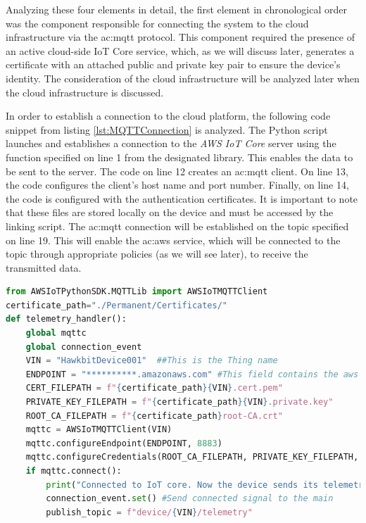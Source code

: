 Analyzing these four elements in detail, the first element in chronological order was the component responsible for connecting the system to the cloud infrastructure via the \gls{ac:mqtt} protocol. This component required the presence of an active cloud-side IoT Core service, which, as we will discuss later, generates a certificate with an attached public and private key pair to ensure the device's identity. The consideration of the cloud infrastructure will be analyzed later when the cloud infrastructure is discussed.

In order to establish a connection to the cloud platform, the following code snippet from listing \ref{lst:MQTTConnection} is analyzed. The Python script launches and establishes a connection to the \textit{AWS IoT Core} server using the function specified on line 1 from the designated library. This enables the data to be sent to the server. The code on line 12 creates an \gls{ac:mqtt} client. On line 13, the code configures the client's host name and port number. Finally, on line 14, the code is configured with the authentication certificates. It is important to note that these files are stored locally on the device and must be accessed by the linking script. The \gls{ac:mqtt} connection will be established on the topic specified on line 19. This will enable the \gls{ac:aws} service, which will be connected to the topic through appropriate policies (as we will see later), to receive the transmitted data.

\begin{lstlisting}[language=Python, caption={\textit{MQTT} connection to the \textit{AWS IoT Core} \textit{AWS} service}, label=lst:MQTTConnection, linerange={1-23}]
from AWSIoTPythonSDK.MQTTLib import AWSIoTMQTTClient
certificate_path="./Permanent/Certificates/"
def telemetry_handler():
    global mqttc
    global connection_event
    VIN = "HawkbitDevice001"  ##This is the Thing name
    ENDPOINT = "**********.amazonaws.com" #This field contains the aws region
    CERT_FILEPATH = f"{certificate_path}{VIN}.cert.pem"
    PRIVATE_KEY_FILEPATH = f"{certificate_path}{VIN}.private.key"
    ROOT_CA_FILEPATH = f"{certificate_path}root-CA.crt"
    mqttc = AWSIoTMQTTClient(VIN)
    mqttc.configureEndpoint(ENDPOINT, 8883)
    mqttc.configureCredentials(ROOT_CA_FILEPATH, PRIVATE_KEY_FILEPATH, CERT_FILEPATH)
    if mqttc.connect():
        print("Connected to IoT core. Now the device sends its telemetry every 1 seconds")
        connection_event.set() #Send connected signal to the main
        publish_topic = f"device/{VIN}/telemetry"
\end{lstlisting}

